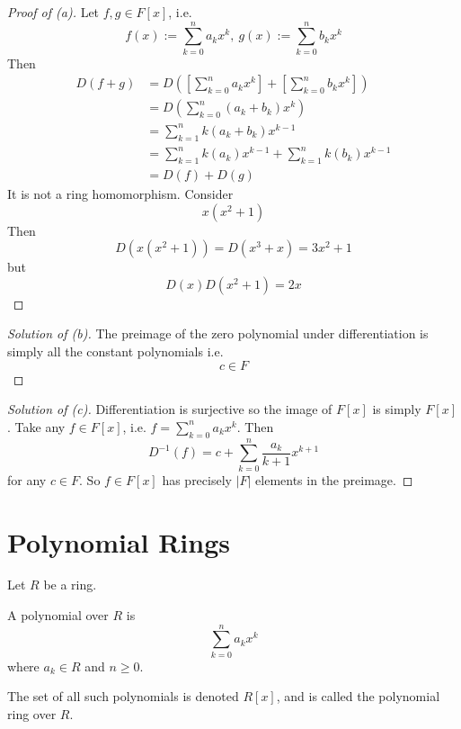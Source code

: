 \begin{proof}[Proof of (a)]
    Let $f,g \in F[x]$, i.e. 
    \[
        f(x) := \displaystyle\sum_{k=0}^{n}a_kx^k, \ 
        g(x) := \displaystyle\sum_{k=0}^{n}b_kx^k
    \]
    Then 
    \begin{align*}
        D(f+g) 
        &= D\left(\left[\displaystyle\sum_{k=0}^{n}a_kx^k\right] 
        + \left[\displaystyle\sum_{k=0}^{n}b_kx^k\right]\right) \\ 
        &= D\left(\displaystyle\sum_{k=0}^{n}(a_k+b_k)x^k\right) \\ 
        &= \displaystyle\sum_{k=1}^{n}k(a_k+b_k)x^{k-1} \\ 
        &= \displaystyle\sum_{k=1}^{n}k(a_k)x^{k-1} + 
        \displaystyle\sum_{k=1}^{n}k(b_k)x^{k-1} \\ 
        &= D(f) + D(g)
    \end{align*}
    It is not a ring homomorphism. Consider 
    \[
        x(x^2 + 1)
    \]
    Then 
    \[
        D(x(x^2 + 1)) = D(x^3 + x) = 3x^2 + 1
    \]
    but 
    \[
        D(x)D(x^2 + 1) = 2x
    \]
\end{proof}
\begin{proof}[Solution of (b)]
    The preimage of the zero polynomial under differentiation is 
    simply all the constant polynomials i.e. 
    \[
        c \in F
    \]
\end{proof}
\begin{proof}[Solution of (c)]
    Differentiation is surjective so the image of $F[x]$ is 
    simply $F[x]$. Take any $f \in F[x]$, i.e. 
    $f = \sum_{k=0}^{n}a_kx^k$. Then 
    \[
        D^{-1}(f) = 
        c + \displaystyle\sum_{k=0}^{n}\frac{a_k}{k+1}x^{k+1}
    \]
    for any $c \in F$. So $f \in F[x]$ has precisely $|F|$ 
    elements in the preimage.
\end{proof}

\newpage 
\section{Polynomial Rings}
\begin{defn}
    Let $R$ be a ring. 

    A polynomial over $R$ is 
    \[
        \displaystyle\sum_{k=0}^{n}a_kx^k
    \]
    where $a_k \in R$ and $n \geq 0$.

    The set of all such polynomials is denoted $R[x]$, 
    and is called the polynomial ring over $R$.

    
\end{defn}

